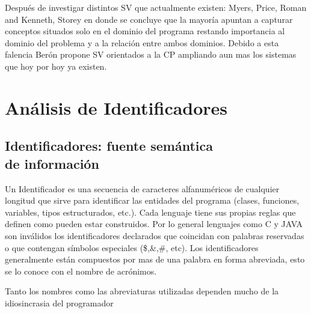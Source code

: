\documentclass[12pt]{report}
\begin{document}
Después de investigar distintos SV que actualmente existen: Myers, Price, Roman and Kenneth, Storey\cite{MBPHRU10} %
en donde se concluye que la mayoría apuntan a capturar conceptos situados solo en el dominio del programa restando importancia al dominio del problema y a la relación entre ambos dominios. Debido a esta falencia Berón propone\cite{MBPHRU10} %
SV orientados a la CP ampliando aun mas los sistemas que hoy por hoy ya existen.
 




\chapter{Análisis de Identificadores}
\section{Identificadores: fuente semántica \\de información}

Un Identificador es una secuencia de caracteres alfanuméricos de cualquier longitud que sirve para identificar las entidades del programa (clases, funciones, variables, tipos estructurados, etc.). 
Cada lenguaje tiene sus propias reglas que definen como pueden estar construidos. Por lo general lenguajes como C y JAVA son inválidos los identificadores declarados que coincidan con palabras reservadas o que contengan símbolos especiales (\$,\&,\#, etc).
Los identificadores generalmente están compuestos por mas de una palabra en forma abreviada, esto se lo conoce con el nombre de acrónimos.


Tanto los nombres como las abreviaturas utilizadas dependen mucho de la idiosincrasia del programador


\end{document}
